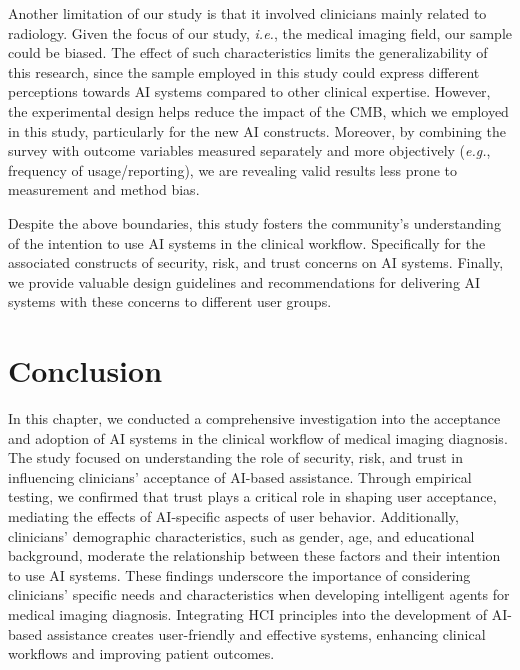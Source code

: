 Another limitation of our study is that it involved clinicians mainly related to radiology.
Given the focus of our study, {\it i.e.}, the medical imaging field, our sample could be biased.
The effect of such characteristics limits the generalizability of this research, since the sample employed in this study could express different perceptions towards \ac{AI} systems compared to other clinical expertise.
However, the experimental design helps reduce the impact of the \ac{CMB}, which we employed in this study, particularly for the new \ac{AI} constructs.
Moreover, by combining the survey with outcome variables measured separately and more objectively ({\it e.g.}, frequency of usage/reporting), we are revealing valid results less prone to measurement and method bias.

Despite the above boundaries, this study fosters the community's understanding of the intention to use AI systems in the clinical workflow. Specifically for the associated constructs of security, risk, and trust concerns on \ac{AI} systems.
Finally, we provide valuable design guidelines and recommendations for delivering \ac{AI} systems with these concerns to different user groups.

\section{Conclusion}
\label{sec:chap004008}

In this chapter, we conducted a comprehensive investigation into the acceptance and adoption of \ac{AI} systems in the clinical workflow of medical imaging diagnosis.
The study focused on understanding the role of security, risk, and trust in influencing clinicians' acceptance of \ac{AI}-based assistance.
Through empirical testing, we confirmed that trust plays a critical role in shaping user acceptance, mediating the effects of \ac{AI}-specific aspects of user behavior.
Additionally, clinicians' demographic characteristics, such as gender, age, and educational background, moderate the relationship between these factors and their intention to use \ac{AI} systems.
These findings underscore the importance of considering clinicians' specific needs and characteristics when developing intelligent agents for medical imaging diagnosis.
Integrating \ac{HCI} principles into the development of \ac{AI}-based assistance creates user-friendly and effective systems, enhancing clinical workflows and improving patient outcomes.


